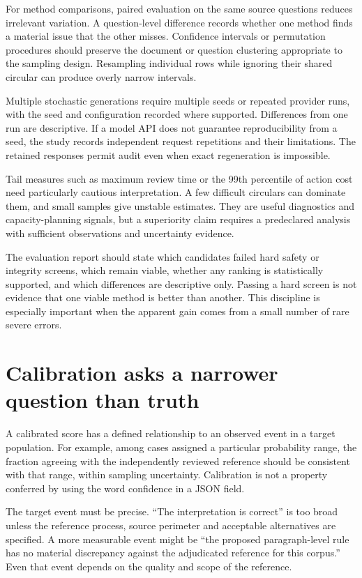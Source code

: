 \documentclass[12pt,a4paper,oneside,openany]{book}
\begin{document}
For method comparisons, paired evaluation on the same source questions reduces
irrelevant variation. A question-level difference records whether one method
finds a material issue that the other misses. Confidence intervals or permutation
procedures should preserve the document or question clustering appropriate to the
sampling design. Resampling individual rows while ignoring their shared circular
can produce overly narrow intervals.

Multiple stochastic generations require multiple seeds or repeated provider runs,
with the seed and configuration recorded where supported. Differences from one
run are descriptive. If a model API does not guarantee reproducibility from a
seed, the study records independent request repetitions and their limitations.
The retained responses permit audit even when exact regeneration is impossible.

Tail measures such as maximum review time or the 99th percentile of action cost
need particularly cautious interpretation. A few difficult circulars can dominate
them, and small samples give unstable estimates. They are useful diagnostics and
capacity-planning signals, but a superiority claim requires a predeclared analysis
with sufficient observations and uncertainty evidence.

The evaluation report should state which candidates failed hard safety or
integrity screens, which remain viable, whether any ranking is statistically
supported, and which differences are descriptive only. Passing a hard screen is
not evidence that one viable method is better than another. This discipline is
especially important when the apparent gain comes from a small number of rare
severe errors.

\section{Calibration asks a narrower question than truth}
\label{merge:M09:08}


A calibrated score has a defined relationship to an observed event in a target
population. For example, among cases assigned a particular probability range,
the fraction agreeing with the independently reviewed reference should be
consistent with that range, within sampling uncertainty. Calibration is not a
property conferred by using the word confidence in a JSON field.

The target event must be precise. ``The interpretation is correct'' is too broad
unless the reference process, source perimeter and acceptable alternatives are
specified. A more measurable event might be ``the proposed paragraph-level rule
has no material discrepancy against the adjudicated reference for this corpus.''
Even that event depends on the quality and scope of the reference.
\end{document}
